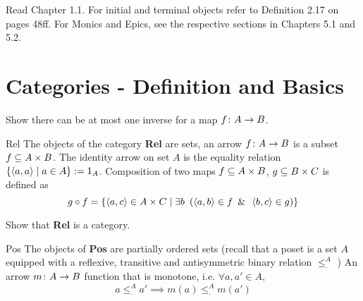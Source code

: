 
\def\pathToRoot{../../}




\begin{hint}
  Read Chapter 1.1. For initial and terminal objects refer to Definition 2.17 on pages 48ff. For Monics and Epics, see the respective sections in Chapters 5.1 and 5.2.
\end{hint}

%

\section{Categories - Definition and Basics}

\begin {exercise}
Show there can be at most one inverse for a map $f \from A \to B$.
\end{exercise}

\begin {definition}{Rel}
The objects of the category \textbf{Rel} are sets, an arrow $f \from A \to B$ is a subset $f \subseteq A \times B$. 
The identity arrow on set $A$ is the equality relation $\{\left\langle a,a\right\rangle \mathrel{|} a \in A\} := 1_A$. 
Composition of two maps $f \subseteq A \times B$, $g \subseteq B \times C$ is defined as 
\[ g \mathbin{\circ} f = \{ \left\langle a, c\right\rangle \in A \times C \mathrel{|} \exists b \hspace*{.5em} (\left\langle a, b\right\rangle \in f \hspace*{.5em} \& \hspace*{.5em} \left\langle b, c\right\rangle \in g)\} \]
\end{definition}

\begin {exercise}
Show that \textbf{Rel} is a category.
\end{exercise}


\begin{definition}{Pos} The objects of  \textbf{Pos} are partially ordered sets 
(recall that a poset is a set $A$ equipped with a reflexive, transitive and antisymmetric binary relation $\leq^A_\cdot $ ) 
An arrow $ m \from A \to B $ function that is monotone, i.e. $\forall a, a' \in A$, 
\[a \leq^A_\cdot a' \implies m(a) \leq^A_\cdot m(a')\]
\end{definition}


